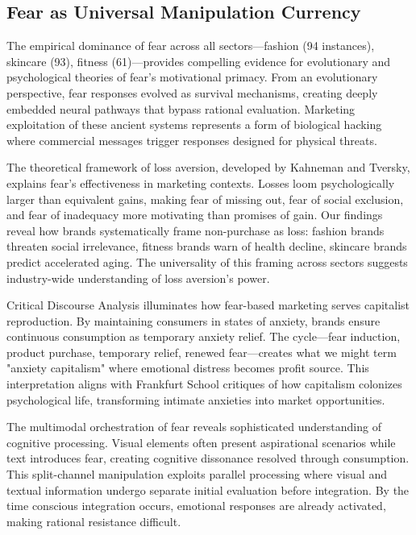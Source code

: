\subsection{Fear as Universal Manipulation Currency}

The empirical dominance of fear across all sectors—fashion (94 instances), skincare (93), fitness (61)—provides compelling evidence for evolutionary and psychological theories of fear's motivational primacy. From an evolutionary perspective, fear responses evolved as survival mechanisms, creating deeply embedded neural pathways that bypass rational evaluation. Marketing exploitation of these ancient systems represents a form of biological hacking where commercial messages trigger responses designed for physical threats.

The theoretical framework of loss aversion, developed by Kahneman and Tversky, explains fear's effectiveness in marketing contexts. Losses loom psychologically larger than equivalent gains, making fear of missing out, fear of social exclusion, and fear of inadequacy more motivating than promises of gain. Our findings reveal how brands systematically frame non-purchase as loss: fashion brands threaten social irrelevance, fitness brands warn of health decline, skincare brands predict accelerated aging. The universality of this framing across sectors suggests industry-wide understanding of loss aversion's power.

Critical Discourse Analysis illuminates how fear-based marketing serves capitalist reproduction. By maintaining consumers in states of anxiety, brands ensure continuous consumption as temporary anxiety relief. The cycle—fear induction, product purchase, temporary relief, renewed fear—creates what we might term "anxiety capitalism" where emotional distress becomes profit source. This interpretation aligns with Frankfurt School critiques of how capitalism colonizes psychological life, transforming intimate anxieties into market opportunities.

The multimodal orchestration of fear reveals sophisticated understanding of cognitive processing. Visual elements often present aspirational scenarios while text introduces fear, creating cognitive dissonance resolved through consumption. This split-channel manipulation exploits parallel processing where visual and textual information undergo separate initial evaluation before integration. By the time conscious integration occurs, emotional responses are already activated, making rational resistance difficult.

